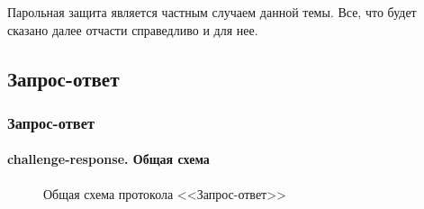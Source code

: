 Парольная защита является частным случаем данной темы. Все, что будет сказано далее отчасти справедливо и для нее.


\subsection{Запрос-ответ}


\begin{frame}
\frametitle{Запрос-ответ}
\framesubtitle{challenge-response. Общая схема}
\begin{figure}
    \begin{center}
    \end{center}
    \caption{Общая схема протокола <<Запрос-ответ>>}\label{pict:chalresp}
\end{figure} 
\end{frame}


